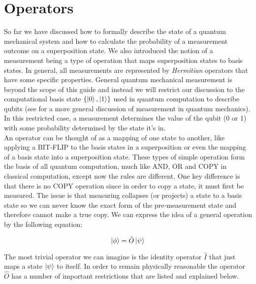 \section{Operators}

So far we have discussed how to formally describe the state of a quantum mechanical system and how to calculate the probability of a measurement outcome on a superposition state. We also introduced the notion of a measurement being a type of operation that maps superposition states to basis states. In general, all measurements are represented by \textit{Hermitian} operators that have some specific properties. General quantum mechanical measurement is beyond the scope of this guide and instead we will restrict our discussion to the computational basis state $\{\left\vert{0}\right\rangle, \left\vert{1}\right\rangle\}$ used in quantum computation to describe qubits (see \cite{Busch1996} for a more general discussion of measurement in quantum mechanics). In this restricted case, a measurement determines the value of the qubit (0 or 1) with some probability determined by the state it's in. \\

An operator can be thought of as a mapping of one state to another, like applying a BIT-FLIP to the basis states in a superposition or even the mapping of a basis state into a superposition state. These types of simple operation form the basis of all quantum computation, much like AND, OR and COPY in classical computation, except now the rules are different. One key difference is that there is no COPY operation since in order to copy a state, it must first be measured. The issue is that measuring collapses (or projects) a state to a basis state so we can never know the exact form of the pre-measurement state and therefore cannot make a true copy. We can express the idea of a general operation by the following equation:

\begin{equation}
    \left\vert{\phi}\right\rangle=\hat{O}\left\vert{\psi}\right\rangle
\end{equation}

The most trivial operator we can imagine is the identity operator $\hat{I}$ that just maps a state $\left\vert{\psi}\right\rangle$ to itself. In order to remain physically reasonable the operator $\hat{O}$ has a number of important restrictions that are listed and explained below.

